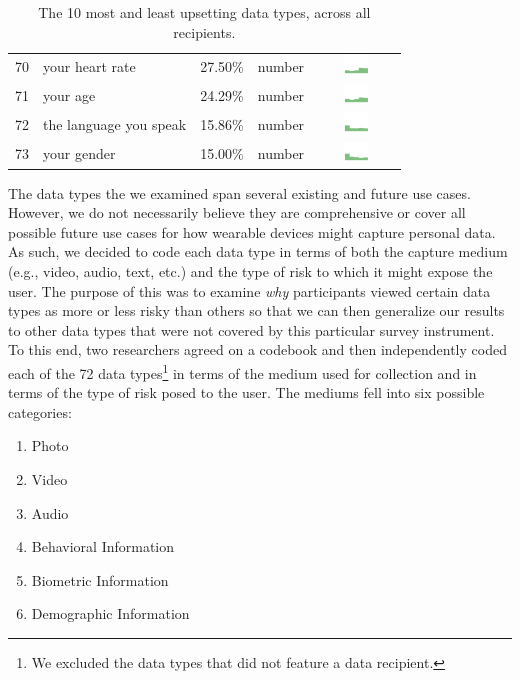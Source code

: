 \begin{table}[t]
\begin{center}
\begin{tabular}{| r | l | r | l |c |}
70 & your heart rate & 27.50\% & number & \includegraphics[width = 2cm, height = 0.5cm]{tex-inputs/data10/learnedyourheartratecombined} \\
71 & your age & 24.29\% & number & \includegraphics[width = 2cm, height = 0.5cm]{tex-inputs/data10/learnedyouragecombined}\\
72 & the language you speak & 15.86\% & number & \includegraphics[width = 2cm, height = 0.5cm]{tex-inputs/data10/learnedthelanguageyouwerespeakingcombined}\\
73 & your gender & 15.00\% & number & \includegraphics[width = 2cm, height = 0.5cm]{tex-inputs/data10/learnedyourgendercombined}\\ 
\hline
\end{tabular}
\caption{The 10 most and least upsetting data types, across all recipients.}
\label{top10-table}
\end{center}
\end{table}

The data types the we examined span several existing and future use cases. However, we do not necessarily believe they are comprehensive or cover all possible future use cases for how wearable devices might capture personal data. As such, we decided to code each data type in terms of both the capture medium (e.g., video, audio, text, etc.) and the type of risk to which it might expose the user. The purpose of this was to examine {\it why} participants viewed certain data types as more or less risky than others so that we can then generalize our results to other data types that were not covered by this particular survey instrument. To this end, two researchers agreed on a codebook and then independently coded each of the 72 data types\footnote{We excluded the data types that did not feature a data recipient.} in terms of the medium used for collection and in terms of the type of risk posed to the user. The mediums fell into six possible categories:

\begin{enumerate}
\item Photo
\item Video
\item Audio
\item Behavioral Information
\item Biometric Information
\item Demographic Information
\end{enumerate}

